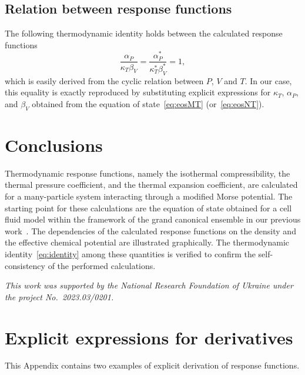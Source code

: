 \subsection{Relation between response functions}
The following thermodynamic identity holds between the calculated response functions
\begin{equation}
	\label{eq:identity}
	\frac{\alpha_P}{\kappa_T \beta_V} = \frac{\alpha^*_P}{\kappa^*_T \beta^*_V} = 1,
\end{equation}
which is easily derived from the cyclic relation between $P$, $V$ and $T$. In our case, this equality is exactly reproduced by substituting explicit expressions for $\kappa_T$, $\alpha_P$, and $\beta_V$ obtained from the equation of state~\eqref{eq:eosMT} (or~\eqref{eq:eosNT}). 


\section{Conclusions}
Thermodynamic response functions, namely the isothermal compressibility, the thermal pressure coefficient, and the thermal expansion coefficient, are calculated for a many-particle system interacting through a modified Morse potential. The starting point for these calculations are the equation of state obtained for a cell fluid model within the framework of the grand canonical ensemble in our previous work~\cite{KozlovskiiDobush2020}. The dependencies of the calculated response functions on the density and the effective chemical potential are illustrated graphically. The thermodynamic identity~\eqref{eq:identity} among these quantities is verified to confirm the self-consistency of the performed calculations.

\vskip3mm \textit{This work was supported by the National Research Foundation of Ukraine under the project No.~2023.03/0201.}

\appendix
\renewcommand{\theequation}{A.\arabic{equation}}
\setcounter{equation}{0}

\section{\label{sec:app-a} Explicit expressions for derivatives}
This Appendix contains two examples of explicit derivation of response functions. 

